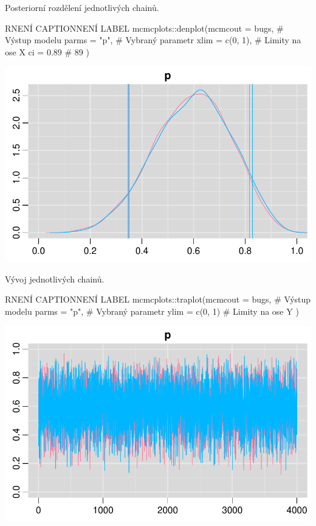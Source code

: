 \documentclass[
  11pt,
  a4paper]{report}
\begin{document}
Posteriorní rozdělení jednotlivých chainů.

\begin{code}{R}{NENÍ CAPTION}{NENÍ LABEL}
mcmcplots::denplot(mcmcout = bugs, # Výstup modelu
                   parms = "p",    # Vybraný parametr
                   xlim = c(0, 1), # Limity na ose X
                   ci = 0.89       # 89%
)
\end{code}

\includegraphics{index_files/figure-pdf/unnamed-chunk-7-1.pdf}

Vývoj jednotlivých chainů.

\begin{code}{R}{NENÍ CAPTION}{NENÍ LABEL}
mcmcplots::traplot(mcmcout = bugs, # Výstup modelu
                   parms = "p",    # Vybraný parametr
                   ylim = c(0, 1)  # Limity na ose Y
)
\end{code}

\includegraphics{index_files/figure-pdf/unnamed-chunk-8-1.pdf}
\end{document}
